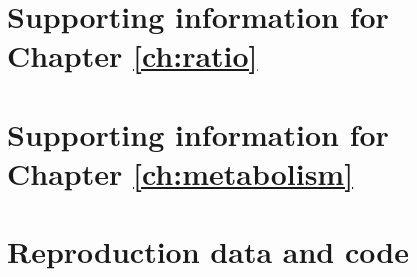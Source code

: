 \chapter{Supporting information for Chapter \ref{ch:ratio}}
\label{appendix:ratio}



\newpage

\chapter{Supporting information for Chapter \ref{ch:metabolism}}
\label{appendix:metabolism}



\newpage

\chapter{Reproduction data and code}
\label{appendix:data}

